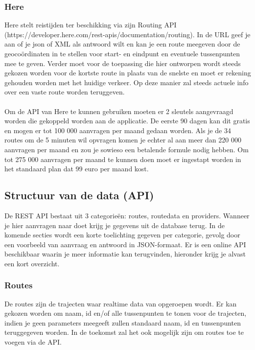 \documentclass[ps,a4paper,oneside]{report}
\begin{document}
\subsubsection{Here}
Here stelt reistijden ter beschikking via zijn Routing API \\(https://developer.here.com/rest-apis/documentation/routing). In de URL geef je aan of je json of XML als antwoord wilt en kan je een route meegeven door de geoco\"ordinaten in te stellen voor start- en eindpunt en eventuele tussenpunten mee te geven. Verder moet voor de toepassing die hier ontworpen wordt steeds gekozen worden voor de kortste route in plaats van de snelste en moet er rekening gehouden worden met het huidige verkeer. Op deze manier zal steeds actuele info over een vaste route worden teruggeven.\\\\
Om de API van Here te kunnen gebruiken moeten er 2 sleutels aangevraagd worden die gekoppeld worden aan de applicatie. De eerste 90 dagen kan dit gratis en mogen er tot 100 000 aanvragen per maand gedaan worden. Als je de 34 routes om de 5 minuten wil opvragen komen je echter al aan meer dan 220 000 aanvragen per maand en zou je sowieso een betalende formule nodig hebben. Om tot 275 000 aanvragen per maand te kunnen doen moet er ingestapt worden in het standaard plan dat 99 euro per maand kost.\\
\subsection{Structuur van de data (API)}
De REST API bestaat uit 3 categorie\"en: routes, routedata en providers. Wanneer je hier aanvragen naar doet krijg je gegevens uit de database terug. In de komende secties wordt een korte toelichting gegeven per categorie, gevolg door een voorbeeld van aanvraag en antwoord in JSON-formaat. Er is een online API beschikbaar waarin je meer informatie kan terugvinden, hieronder krijg je alvast een kort overzicht.

\subsubsection{Routes}
De routes zijn de trajecten waar realtime data van opgeroepen wordt. Er kan gekozen worden om naam, id en/of alle tussenpunten te tonen voor de trajecten, indien je geen parameters meegeeft zullen standaard naam, id en tussenpunten teruggegeven worden. In de toekomst zal het ook mogelijk zijn om routes toe te voegen via de API.\\
\end{document}
